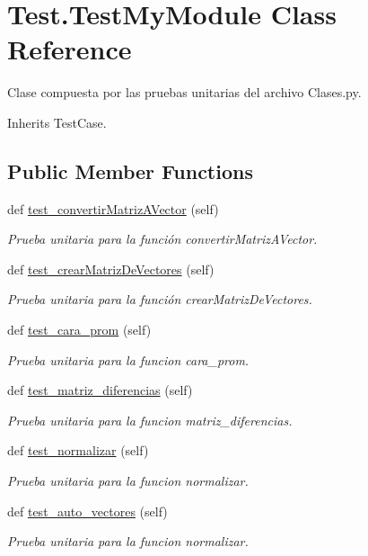 \hypertarget{class_test_1_1_test_my_module}{}\section{Test.\+Test\+My\+Module Class Reference}
\label{class_test_1_1_test_my_module}


Clase compuesta por las pruebas unitarias del archivo Clases.\+py.  




Inherits Test\+Case.

\subsection*{Public Member Functions}
\begin{DoxyCompactItemize}
\item 
def \hyperlink{class_test_1_1_test_my_module_a3bd24c5133eed43ca6136f656a87631c}{test\+\_\+convertir\+Matriz\+A\+Vector} (self)
\begin{DoxyCompactList}\small\item\em Prueba unitaria para la función convertir\+Matriz\+A\+Vector. \end{DoxyCompactList}\item 
def \hyperlink{class_test_1_1_test_my_module_a0cd4d23560e53612142c3d8a48a74f37}{test\+\_\+crear\+Matriz\+De\+Vectores} (self)
\begin{DoxyCompactList}\small\item\em Prueba unitaria para la función crear\+Matriz\+De\+Vectores. \end{DoxyCompactList}\item 
def \hyperlink{class_test_1_1_test_my_module_ac90753e0abdae446a1a75b174502ff2e}{test\+\_\+cara\+\_\+prom} (self)
\begin{DoxyCompactList}\small\item\em Prueba unitaria para la funcion cara\+\_\+prom. \end{DoxyCompactList}\item 
def \hyperlink{class_test_1_1_test_my_module_a39c919b692c45a67055880c5aa38fe6d}{test\+\_\+matriz\+\_\+diferencias} (self)
\begin{DoxyCompactList}\small\item\em Prueba unitaria para la funcion matriz\+\_\+diferencias. \end{DoxyCompactList}\item 
def \hyperlink{class_test_1_1_test_my_module_a7596dd0f3e897a276e057cfa6557ef1b}{test\+\_\+normalizar} (self)
\begin{DoxyCompactList}\small\item\em Prueba unitaria para la funcion normalizar. \end{DoxyCompactList}\item 
def \hyperlink{class_test_1_1_test_my_module_a410b576b5600f79f13570c7076bf9bf6}{test\+\_\+auto\+\_\+vectores} (self)
\begin{DoxyCompactList}\small\item\em Prueba unitaria para la funcion normalizar. \end{DoxyCompactList}\end{DoxyCompactItemize}


